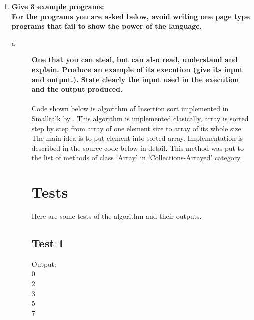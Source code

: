 \documentclass[5pt]{article}
\begin{document}
\begin{enumerate}
\begin{description}
{  your answer with the existence or lack of language constructs.}\\
  \\
  For programming in Smalltalk can programmer use only a few language
  conctructs. The fundamental construct in Smalltalk is message and as presented
  before, programmer will need for nearly every
    application only this data types: \textit{Object}, \textit{Number} and its
    subclasses, \textit{Character}, \textit{String}, \textit{Symbol} and
    \textit{Boolean}. That makes Smalltalk very powerful for lot of pragmatics,
    e.g.: Artificial intelligence reasoning, General purpose applications,
    Financial time series analysis, Natural language processing, Relational
    database querying, Application scripting, Internet, Symbolic mathematics,
    Numerical mathematics, Statistical applications, Text processing, Matrix
    algorithms.
  \end{description}
  \item \textbf{Give 3 example programs:}\\
\textbf{For the programs you are asked below, avoid writing one page type
programs that fail to show the power of the language.}
  \begin{description}
  \item[a]\textbf{One that you can steal, but can also read, understand and
  explain. Produce an example of its execution (give its input and output.). State clearly the input used in the execution and the output
produced.}\\
\\
Code shown below is algorithm of Insertion sort implemented in Smalltalk by
\cite{lp:insertion_sort}. This algorithm is implemented clasically, array is
sorted step by step from array of one element size to array of its whole size.
The main idea is to put element into sorted array. Implementation is described
in the source code below in detail. This method was put to the list of methods
of class 'Array' in 'Collections-Arrayed' category.
\newpage


\section{Tests}
Here are some tests of the algorithm and their outputs.
\subsection{Test 1}

Output:\\
0\\
2\\
3\\
5\\
7\\


\end{description}
\end{enumerate}
\end{document}

